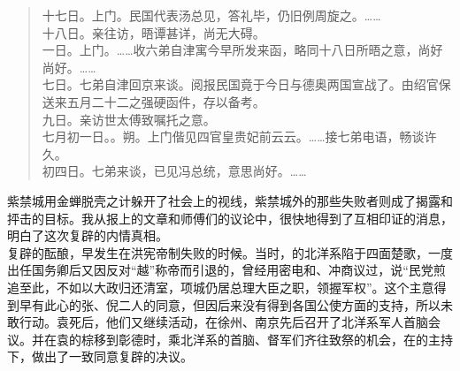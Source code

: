 \begin{quote}
十七日。上门。民国代表汤总见，答礼毕，仍旧例周旋之。……\\

十八日。亲往访，晤谭甚详，尚无大碍。\\

一日。上门。……收六弟自津寓今早所发来函，略同十八日所晤之意，尚好尚好。……\\

七日。七弟自津回京来谈。阅报民国竟于今日与德奥两国宣战了。由绍官保送来五月二十二之强硬函件，存以备考。\\

九日。亲访世太傅致嘱托之意。\\

七月初一日。。朔。上门偕见四官皇贵妃前云云。……接七弟电语，畅谈许久。\\

初四日。七弟来谈，已见冯总统，意思尚好。……\\
\end{quote}

紫禁城用金蝉脱壳之计躲开了社会上的视线，紫禁城外的那些失败者则成了揭露和抨击的目标。我从报上的文章和师傅们的议论中，很快地得到了互相印证的消息，明白了这次复辟的内情真相。\\

复辟的酝酿，早发生在洪宪帝制失败的时候。当时，的北洋系陷于四面楚歌，一度出任国务卿后又因反对“越”称帝而引退的，曾经用密电和、冲商议过，说“民党煎追至此，不如以大政归还清室，项城仍居总理大臣之职，领握军权”。这个主意得到早有此心的张、倪二人的同意，但因后来没有得到各国公使方面的支持，所以未敢行动。袁死后，他们又继续活动，在徐州、南京先后召开了北洋系军人首脑会议。并在袁的棕移到彰德时，乘北洋系的首脑、督军们齐往致祭的机会，在的主持下，做出了一致同意复辟的决议。\\

